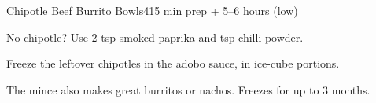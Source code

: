 \begin{recipebox}{Chipotle Beef Burrito Bowls}{4}{15 min prep + 5--6 hours (low)}
\begin{notelist}
  \item No chipotle? Use 2 tsp smoked paprika and  tsp chilli powder.
  \item Freeze the leftover chipotles in the adobo sauce, in ice-cube portions.
  \item The mince also makes great burritos or nachos. Freezes for up to 3 months.
\end{notelist}

\end{recipebox}
